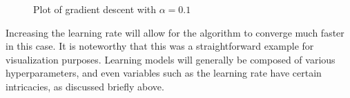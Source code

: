  \begin{figure}
	\begin{center}
	\end{center}
	\caption{Plot of gradient descent with $\alpha = 0.1$} \label{f:LR01}
\end{figure}

\noindent Increasing the learning rate will allow for the algorithm to converge much faster in this case. It is noteworthy that this was a straightforward example for visualization purposes. Learning models will generally be composed of various hyperparameters, and even variables such as the learning rate have certain intricacies, as discussed briefly above.


 


